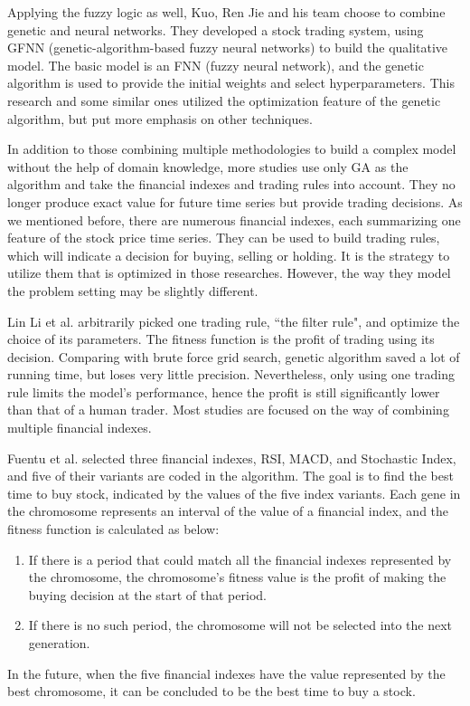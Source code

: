 \documentclass{article}
\begin{document}
Applying the fuzzy logic as well, Kuo, Ren Jie and his team \cite{an-intelligent-stock-trading-decision-support-system}
choose to combine genetic and neural networks.
They developed a stock trading system, using GFNN (genetic-algorithm-based fuzzy neural networks)
to build the qualitative model.
The basic model is an FNN (fuzzy neural network), and
the genetic algorithm is used to provide the initial weights and select hyperparameters.
This research and some similar ones utilized the optimization feature of the genetic algorithm,
but put more emphasis on other techniques.

In addition to those combining multiple methodologies to build a complex model
without the help of domain knowledge,
more studies use only GA as the algorithm and take the financial indexes and trading rules into account.
They no longer produce exact value for future time series but provide trading decisions.
As we mentioned before, there are numerous financial indexes,
each summarizing one feature of the stock price time series.
They can be used to build trading rules, which will indicate a decision for buying, selling or holding.
It is the strategy to utilize them that is optimized in those researches.
However, the way they model the problem setting may be slightly different.

Lin Li et al. \cite{the-applications-of-genetic-algorithms-in-stock-market-data-mining}
arbitrarily picked one trading rule, ``the filter rule", and optimize the choice of its parameters.
The fitness function is the profit of trading using its decision.
Comparing with brute force grid search, genetic algorithm saved a lot of running time,
but loses very little precision.
Nevertheless, only using one trading rule limits the model's performance, hence
the profit is still significantly lower than that of a human trader.
Most studies are focused on the way of combining multiple financial indexes.

Fuentu et al. \cite{genetic-algorithms-to-optimise-the-time-to-make-stock-market-investment} selected
three financial indexes, RSI, MACD, and Stochastic Index,
and five of their variants are coded in the algorithm.
The goal is to find the best time to buy stock, indicated by the values of the five index variants.
Each gene in the chromosome represents an interval of the value of a financial index,
and the fitness function is calculated as below:
\begin{enumerate}
\item If there is a period that could match all the financial indexes represented by the chromosome,
    the chromosome's fitness value is the profit of making the buying decision at the start of that period.
\item If there is no such period, the chromosome will not be selected into the next generation.
\end{enumerate}
In the future, when the five financial indexes have the value represented by the best chromosome,
it can be concluded to be the best time to buy a stock.
\end{document}
